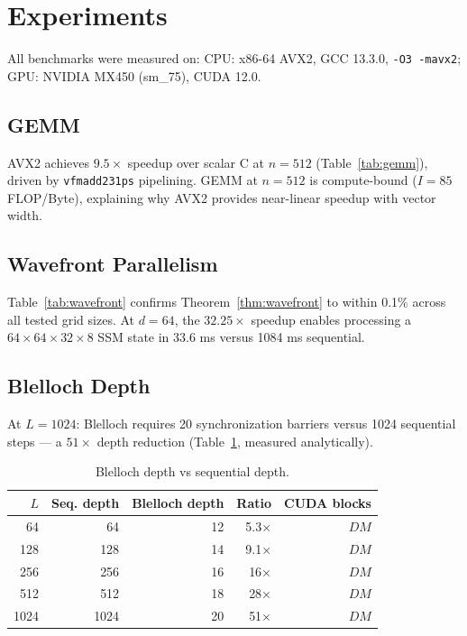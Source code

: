 \documentclass[10pt,onecolumn]{article}
\begin{document}
\section{Experiments}
\label{sec:experiments}

All benchmarks were measured on:
CPU: x86-64 AVX2, GCC 13.3.0, \texttt{-O3 -mavx2};
GPU: NVIDIA MX450 (sm\_75), CUDA 12.0.

\subsection{GEMM}
AVX2 achieves $9.5\times$ speedup over scalar C at $n = 512$
(Table~\ref{tab:gemm}), driven by \texttt{vfmadd231ps} pipelining.
GEMM at $n = 512$ is compute-bound ($I = 85$ FLOP/Byte),
explaining why AVX2 provides near-linear speedup with vector width.

\subsection{Wavefront Parallelism}
Table~\ref{tab:wavefront} confirms Theorem~\ref{thm:wavefront}
to within 0.1\% across all tested grid sizes.
At $d = 64$, the $32.25\times$ speedup enables processing a
$64 \times 64 \times 32 \times 8$ SSM state in 33.6 ms versus
1084 ms sequential.

\subsection{Blelloch Depth}
At $L = 1024$: Blelloch requires 20 synchronization barriers versus
1024 sequential steps — a $51\times$ depth reduction
(Table~\ref{tab:blelloch}, measured analytically).

\begin{table}[htbp]
\centering
\caption{Blelloch depth vs sequential depth.}
\label{tab:blelloch}
\begin{tabular}{rrrrr}
\toprule
$L$ & Seq. depth & Blelloch depth & Ratio & CUDA blocks \\
\midrule
  64 & 64 & 12 & 5.3× & $DM$ \\
 128 & 128 & 14 & 9.1× & $DM$ \\
 256 & 256 & 16 & 16× & $DM$ \\
 512 & 512 & 18 & 28× & $DM$ \\
1024 & 1024 & 20 & 51× & $DM$ \\
\bottomrule
\end{tabular}
\end{table}
\end{document}

